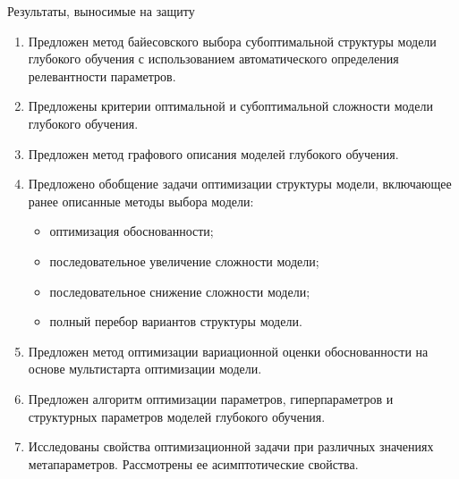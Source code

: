 \documentclass[usenames,dvipsnames,11pt,pdf,utf8,russian,aspectratio=43]{beamer}
\begin{document}
\begin{frame}{Результаты, выносимые на защиту}
\footnotesize
\begin{enumerate}
\item Предложен метод байесовского выбора субоптимальной структуры модели глубокого обучения с использованием автоматического определения релевантности параметров.
\item Предложены критерии оптимальной и субоптимальной сложности модели глубокого обучения.
\item Предложен метод графового описания моделей глубокого обучения.
\item Предложено обобщение задачи оптимизации структуры модели, включающее ранее описанные методы выбора модели:
\begin{itemize}
\footnotesize
\item оптимизация обоснованности;
\item последовательное увеличение сложности модели;
\item последовательное снижение сложности модели;
\item полный перебор вариантов структуры модели.
\end{itemize}


\item Предложен метод оптимизации вариационной оценки обоснованности на основе мультистарта оптимизации модели.
\item Предложен алгоритм оптимизации параметров, гиперпараметров и структурных
параметров моделей глубокого обучения.
 
\item Исследованы свойства оптимизационной задачи при различных значениях метапараметров.  Рассмотрены ее асимптотические свойства.


\end{enumerate}
\end{frame}
\end{document}
